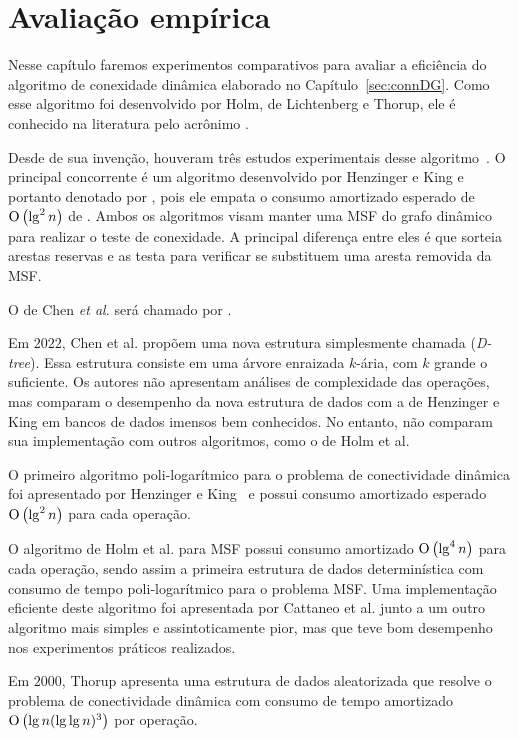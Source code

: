 \chapter{Avaliação empírica}

Nesse capítulo faremos experimentos comparativos para avaliar a eficiência do algoritmo de conexidade dinâmica elaborado no Capítulo~\ref{sec:connDG}. Como esse algoritmo foi desenvolvido  por Holm, de Lichtenberg e Thorup, ele é conhecido na literatura pelo acrônimo \HDT.

Desde de sua invenção, houveram três estudos experimentais desse algoritmo~\cite{EmpiricalStudy1997, EmpiricalStudy2002, Zaroliagis2002}. O principal concorrente é um algoritmo desenvolvido por Henzinger e King e portanto denotado por \HK, pois ele empata o consumo amortizado esperado de $\text{O}\left(\lg^2 n\right)$ de \HDT. Ambos os algoritmos visam manter uma MSF do grafo dinâmico para realizar o teste de conexidade. A principal diferença entre eles é que \HK{} sorteia arestas reservas e as testa para verificar se substituem uma aresta removida da MSF.


O de Chen \textit{et al.} será chamado por \CLHB.

Em $2022$, Chen et al. \cite{QC22} propõem uma nova estrutura simplesmente chamada  (\textit{D-tree}). Essa estrutura consiste em uma árvore enraizada $k$-ária, com $k$ grande o suficiente. Os autores não apresentam análises de complexidade das operações, mas comparam o desempenho da nova estrutura de dados com a de Henzinger e King em bancos de dados imensos bem conhecidos. No entanto, não comparam sua implementação com outros algoritmos, como o de Holm et al.



O primeiro algoritmo poli-logarítmico para o problema de conectividade dinâmica foi apresentado por Henzinger e King~\cite{HenzingerKing} e possui consumo amortizado esperado $\text{O}\left(\lg^2 n\right)$ para cada operação. 



O algoritmo de Holm et al. para MSF possui consumo amortizado $\text{O}\left(\lg^4 n\right)$ para cada operação, sendo assim a primeira estrutura de dados determinística com consumo de tempo poli-logarítmico para o problema MSF. Uma implementação eficiente deste algoritmo foi apresentada por Cattaneo et al. \cite{xpstudy2002} junto a um outro algoritmo mais simples e assintoticamente pior, mas que teve bom desempenho nos experimentos práticos realizados.

Em $2000$, Thorup \cite{Thorup2000} apresenta uma estrutura de dados aleatorizada que resolve o problema de conectividade dinâmica com consumo de tempo amortizado $\text{O}\left(\lg n(\lg\lg n)^3\right)$ por operação.


